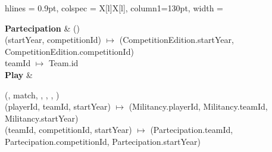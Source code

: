 \newpage


\begin{tblr}{
    hlines = {0.9pt},
    colspec = {X[l]X[l]}, column{1}={130pt},
    width = \textwidth
}


	{
		\textbf{Partecipation}
	}
	&
	{
		()\\
		\bigskip (startYear, competitionId) $\mapsto$
		(CompetitionEdition.startYear,
		CompetitionEdition.competitionId)\\
		teamId $\mapsto$ Team.id
	}
	\\
	{
		\textbf{Play}
	}
	&
	{
		(, match, , ,
		, )\\
		\bigskip (playerId, teamId, startYear) $\mapsto$ (Militancy.playerId,
		Militancy.teamId, Militancy.startYear)\\
		(teamId, competitionId, startYear) $\mapsto$ (Partecipation.teamId,
		Partecipation.competitionId, Partecipation.startYear)
		
}
\end{tblr}
